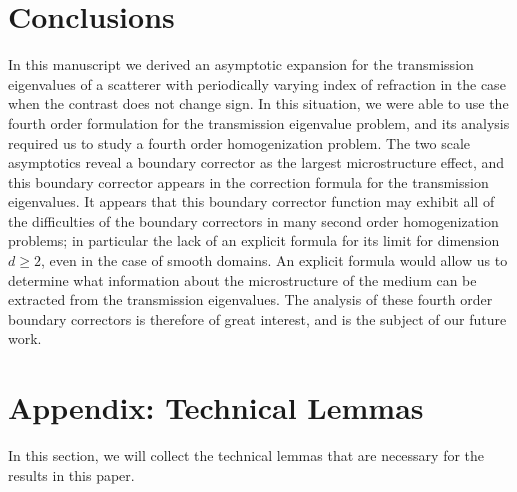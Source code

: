 \documentclass[12pt]{article}
\begin{document}
\section{Conclusions}
In this manuscript we derived an asymptotic expansion for the transmission eigenvalues of a scatterer with periodically varying index of refraction in the case when the contrast does not change sign. In this situation, we were able to use the fourth order formulation for the transmission eigenvalue problem, and its analysis required us to study a fourth order homogenization problem. The two scale asymptotics reveal a boundary corrector as the largest microstructure effect, and this boundary corrector appears in the correction formula for the transmission eigenvalues. It appears that this boundary corrector function may exhibit all of the difficulties of the boundary correctors in many second order homogenization problems; in particular the lack of an explicit formula for its limit for dimension $d\geq 2$, even in the case of smooth domains. 
An explicit formula would allow us to determine what information about the microstructure of the medium can be extracted from the transmission eigenvalues. 
The analysis of these fourth order boundary correctors is therefore of great interest, and is the subject of our future work. 

\section{Appendix: Technical Lemmas}
In this section, we will collect the technical lemmas that are necessary for  the results in this paper. 
\end{document}
